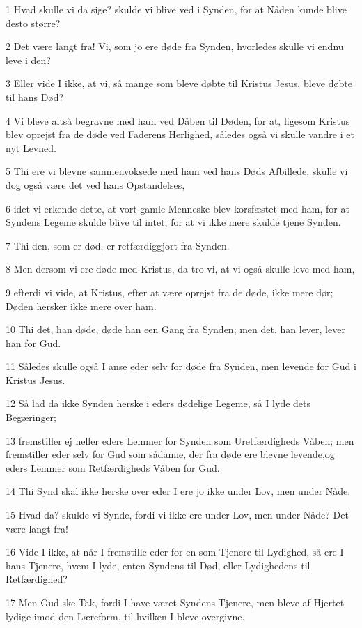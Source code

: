 \par 1 Hvad skulle vi da sige? skulde vi blive ved i Synden, for at Nåden kunde blive desto større?
\par 2 Det være langt fra! Vi, som jo ere døde fra Synden, hvorledes skulle vi endnu leve i den?
\par 3 Eller vide I ikke, at vi, så mange som bleve døbte til Kristus Jesus, bleve døbte til hans Død?
\par 4 Vi bleve altså begravne med ham ved Dåben til Døden, for at, ligesom Kristus blev oprejst fra de døde ved Faderens Herlighed, således også vi skulle vandre i et nyt Levned.
\par 5 Thi ere vi blevne sammenvoksede med ham ved hans Døds Afbillede, skulle vi dog også være det ved hans Opstandelses,
\par 6 idet vi erkende dette, at vort gamle Menneske blev korsfæstet med ham, for at Syndens Legeme skulde blive til intet, for at vi ikke mere skulde tjene Synden.
\par 7 Thi den, som er død, er retfærdiggjort fra Synden.
\par 8 Men dersom vi ere døde med Kristus, da tro vi, at vi også skulle leve med ham,
\par 9 efterdi vi vide, at Kristus, efter at være oprejst fra de døde, ikke mere dør; Døden hersker ikke mere over ham.
\par 10 Thi det, han døde, døde han een Gang fra Synden; men det, han lever, lever han for Gud.
\par 11 Således skulle også I anse eder selv for døde fra Synden, men levende for Gud i Kristus Jesus.
\par 12 Så lad da ikke Synden herske i eders dødelige Legeme, så I lyde dets Begæringer;
\par 13 fremstiller ej heller eders Lemmer for Synden som Uretfærdigheds Våben; men fremstiller eder selv for Gud som sådanne, der fra døde ere blevne levende,og eders Lemmer som Retfærdigheds Våben for Gud.
\par 14 Thi Synd skal ikke herske over eder I ere jo ikke under Lov, men under Nåde.
\par 15 Hvad da? skulde vi Synde, fordi vi ikke ere under Lov, men under Nåde? Det være langt fra!
\par 16 Vide I ikke, at når I fremstille eder for en som Tjenere til Lydighed, så ere I hans Tjenere, hvem I lyde, enten Syndens til Død, eller Lydighedens til Retfærdighed?
\par 17 Men Gud ske Tak, fordi I have været Syndens Tjenere, men bleve af Hjertet lydige imod den Læreform, til hvilken I bleve overgivne.
